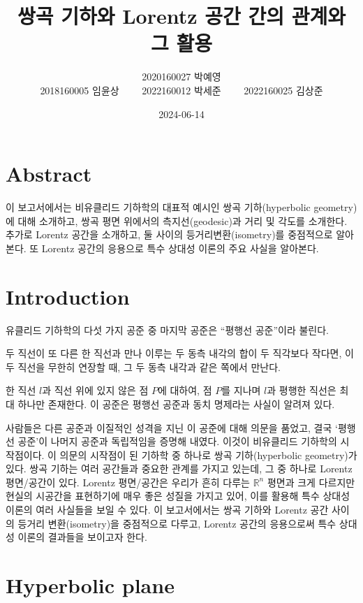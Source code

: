 \documentclass[10pt,a4paper]{article}
\title{쌍곡 기하와 Lorentz 공간 간의 관계와 그 활용}
\author{ %
2020160027 박예영\\
2018160005 임윤상~~ ~~2022160012 박세준~~ ~~2022160025 김상준\\
}
\date{2024-06-14}
\begin{document}
\maketitle
\section*{Abstract}

이 보고서에서는 비유클리드 기하학의 대표적 예시인 쌍곡 기하(hyperbolic geometry)에 대해 소개하고, 쌍곡 평면 위에서의 측지선(geodesic)과 거리 및 각도를 소개한다. 추가로 Lorentz 공간을 소개하고, 둘 사이의 등거리변환(isometry)를 중점적으로 알아본다. 또 Lorentz 공간의 응용으로 특수 상대성 이론의 주요 사실을 알아본다.

\tableofcontents
\newpage
\section{Introduction}

유클리드 기하학의 다섯 가지 공준 중 마지막 공준은 ``평행선 공준''이라 불린다. 
\begin{tcolorbox}[title = 평행선 공준]
두 직선이 또 다른 한 직선과 만나 이루는 두 동측 내각의 합이 두 직각보다 작다면, 이 두 직선을 무한히 연장할 때, 그 두 동측 내각과 같은 쪽에서 만난다.
\end{tcolorbox}
\begin{tcolorbox}[title = 플레이페어의 공준]
한 직선 $l$과 직선 위에 있지 않은 점 $P$에 대하여, 점 $P$를 지나며 $l$과 평행한 직선은 최대 하나만 존재한다. 이 공준은 평행선 공준과 동치 명제라는 사실이 알려져 있다.
\end{tcolorbox}
사람들은 다른 공준과 이질적인 성격을 지닌 이 공준에 대해 의문을 품었고, 결국 `평행선 공준'이 나머지 공준과 독립적임을 증명해 내였다. 이것이 비유클리드 기하학의 시작점이다. 이 의문의 시작점이 된 기하학 중 하나로 쌍곡 기하(hyperbolic geometry)가 있다. 쌍곡 기하는 여러 공간들과 중요한 관계를 가지고 있는데, 그 중 하나로 Lorentz 평면/공간이 있다. Lorentz 평면/공간은 우리가 흔히 다루는 $\mathbb{R}^n$ 평면과 크게 다르지만 현실의 시공간을 표현하기에 매우 좋은 성질을 가지고 있어, 이를 활용해 특수 상대성 이론의 여러 사실들을 보일 수 있다. 이 보고서에서는 쌍곡 기하와 Lorentz 공간 사이의 등거리 변환(isometry)을 중점적으로 다루고, Lorentz 공간의 응용으로써 특수 상대성 이론의 결과들을 보이고자 한다.

\section{Hyperbolic plane}
\end{document}
